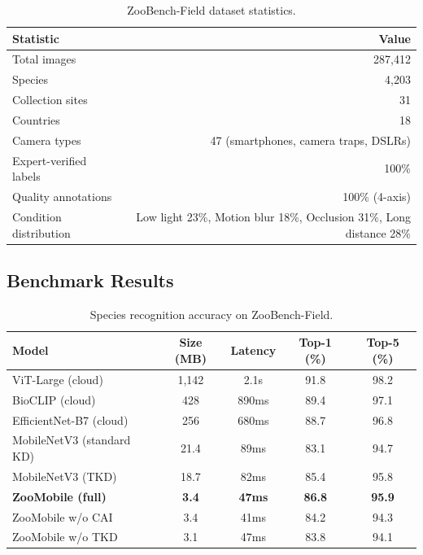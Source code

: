 \documentclass[11pt,a4paper]{article}
\begin{document}
\begin{table}[H]
\centering
\caption{ZooBench-Field dataset statistics.}
\label{tab:zoobench}
\begin{tabular}{@{}lr@{}}
\toprule
\textbf{Statistic} & \textbf{Value} \\
\midrule
Total images & 287,412 \\
Species & 4,203 \\
Collection sites & 31 \\
Countries & 18 \\
Camera types & 47 (smartphones, camera traps, DSLRs) \\
Expert-verified labels & 100\% \\
Quality annotations & 100\% (4-axis) \\
Condition distribution & Low light 23\%, Motion blur 18\%, Occlusion 31\%, Long distance 28\% \\
\bottomrule
\end{tabular}
\end{table}

\subsection{Benchmark Results}

\begin{table}[H]
\centering
\caption{Species recognition accuracy on ZooBench-Field.}
\label{tab:benchmark_results}
\begin{tabular}{@{}lcccc@{}}
\toprule
\textbf{Model} & \textbf{Size (MB)} & \textbf{Latency} & \textbf{Top-1 (\%)} & \textbf{Top-5 (\%)} \\
\midrule
ViT-Large (cloud) & 1,142 & 2.1s & 91.8 & 98.2 \\
BioCLIP (cloud) & 428 & 890ms & 89.4 & 97.1 \\
EfficientNet-B7 (cloud) & 256 & 680ms & 88.7 & 96.8 \\
MobileNetV3 (standard KD) & 21.4 & 89ms & 83.1 & 94.7 \\
MobileNetV3 (TKD) & 18.7 & 82ms & 85.4 & 95.8 \\
\textbf{ZooMobile (full)} & \textbf{3.4} & \textbf{47ms} & \textbf{86.8} & \textbf{95.9} \\
ZooMobile w/o CAI & 3.4 & 41ms & 84.2 & 94.3 \\
ZooMobile w/o TKD & 3.1 & 47ms & 83.8 & 94.1 \\
\bottomrule
\end{tabular}
\end{table}
\end{document}
